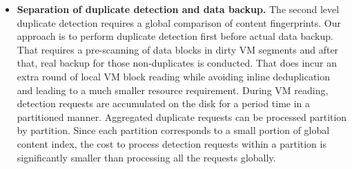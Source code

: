 \begin{itemize}


\item {\bf Separation of duplicate detection and data backup.}
The second level duplicate detection requires a global comparison of 
content fingerprints.
Our approach is to perform duplicate detection first before actual data backup.
That requires a pre-scanning of  data  blocks in dirty VM segments  and after that, real backup  for those non-duplicates
is conducted. That does incur an extra  round of local VM block reading while avoiding inline 
deduplication and leading to a much smaller resource requirement.  
During VM reading, detection requests are accumulated on the disk 
for a period time  in a  partitioned manner.  Aggregated duplicate requests can be processed partition by partition. 
Since each partition corresponds to a small portion of global content index, the cost to 
process detection requests within a partition is significantly smaller than processing all the requests globally.


\end{itemize}
